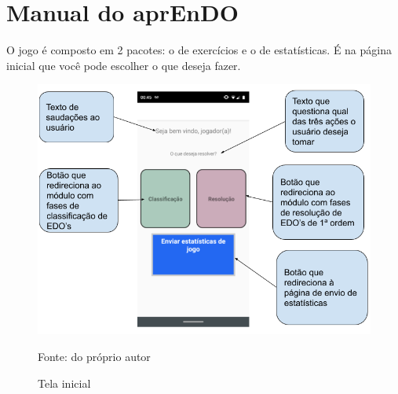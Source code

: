 \chapter[Manual do aprEnDO]{Manual do aprEnDO}
O jogo é composto em 2 pacotes: o de exercícios e o de estatísticas. É na página inicial que você pode escolher o que deseja fazer.

\begin{figure}[H]
\centering
\caption{Tela inicial}
\includegraphics[scale=0.52]{figuras/tela_inicial.png}
\label{tela_inicial}

\small{Fonte: do próprio autor}
\end{figure}



